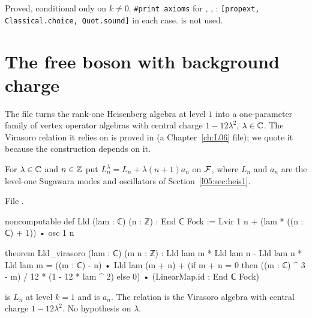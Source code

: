 \begin{status}
Proved, conditional only on $k\ne0$. \texttt{\#print axioms} for
, ,
: \texttt{[propext, Classical.choice, Quot.sound]} in each case.
 is not used.
\end{status}

\section{The free boson with background charge}\label{l05:sec:bg}

The file  turns the rank-one
Heisenberg algebra at level $1$ into a one-parameter family of vertex operator algebras with central charge
$1-12\lambda^2$, $\lambda\in{\mathbb{C}}$. The Virasoro relation it relies on is proved in
 (a Chapter~\ref{ch:L06} file); we quote it
because the construction depends on it.

\begin{definition}\label{l05:def:Lld}
For $\lambda\in{\mathbb{C}}$ and $n\in{\mathbb{Z}}$ put $L^\lambda_n=L_n+\lambda(n+1)a_n$ on $\mathcal{F}$, where $L_n$ and $a_n$ are the
level-one Sugawara modes and oscillators of Section~\ref{l05:sec:heis1}.
\end{definition}

\noindent File .
\begin{leancode}
noncomputable def Lld (lam : ℂ) (n : ℤ) : End ℂ Fock :=
  Lvir 1 n + (lam * ((n : ℂ) + 1)) • osc 1 n

theorem Lld_virasoro (lam : ℂ) (m n : ℤ) :
    Lld lam m * Lld lam n - Lld lam n * Lld lam m
      = ((m : ℂ) - n) • Lld lam (m + n)
        + (if m + n = 0 then ((m : ℂ) ^ 3 - m) / 12 * (1 - 12 * lam ^ 2) else 0)
            • (LinearMap.id : End ℂ Fock)
\end{leancode}

\begin{dictionary}
 is $L_n$ at level $k=1$ and  is $a_n$. The relation is the Virasoro algebra
with central charge $1-12\lambda^2$. No hypothesis on $\lambda$.
\end{dictionary}

